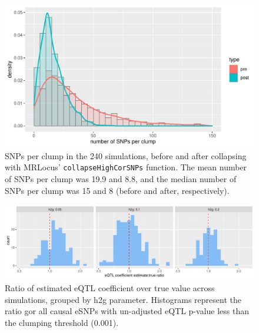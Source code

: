 \documentclass[11pt]{article}
\begin{document}
\begin{figure}[!ht]
  \centering
  \includegraphics[width=.7\textwidth]{figs/snps_per_clump}
  \caption{SNPs per clump in the 240 simulations, before and after
    collapsing with MRLocus’ \texttt{collapseHighCorSNPs}
    function. The mean number of SNPs per clump was 19.9 and 8.8, and
    the median number of SNPs per clump was 15 and 8 (before and
    after, respectively).}
\end{figure}

\begin{figure}[!ht]
  \centering
  \includegraphics[width=\textwidth]{figs/sim_overest}
  \caption{Ratio of estimated eQTL coefficient over true value across
    simulations, grouped by h2g parameter. Histograms represent the
    ratio gor all causal eSNPs with un-adjusted eQTL p-value less than
    the clumping threshold (0.001).}
\end{figure}
\end{document}
